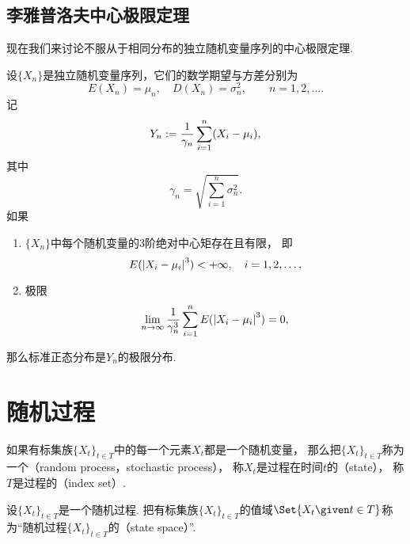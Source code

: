 \subsection{李雅普洛夫中心极限定理}
现在我们来讨论不服从于相同分布的独立随机变量序列的中心极限定理.

\begin{theorem}[李雅普洛夫中心极限定理]
设\(\{X_n\}\)是独立随机变量序列，它们的数学期望与方差分别为\begin{equation*}
	E(X_n) = \mu_n, \quad
	D(X_n) = \sigma_n^2,
	\qquad n=1,2,\dotsc.
\end{equation*}
记\begin{equation*}
	Y_n := \frac{1}{\gamma_n} \sum_{i=1}^n (X_i-\mu_i),
\end{equation*}
其中\begin{equation*}
	\gamma_n = \sqrt{\sum_{i=1}^n \sigma_n^2}.
\end{equation*}
如果\begin{enumerate}
	\item \(\{X_n\}\)中每个随机变量的3阶绝对中心矩存在且有限，
	即\begin{equation*}
		E(\abs{X_i-\mu_i}^3) < +\infty,
		\quad i=1,2,\dotsc,
	\end{equation*}

	\item 极限\begin{equation*}
		\lim_{n\to\infty} \frac{1}{\gamma_n^3}
			\sum_{i=1}^n E(\abs{X_i-\mu_i}^3)
		= 0,
	\end{equation*}
\end{enumerate}
那么标准正态分布是\(Y_n\)的极限分布.
\end{theorem}

\section{随机过程}
\begin{definition}
如果有标集族\(\{X_t\}_{t \in T}\)中的每一个元素\(X_t\)都是一个随机变量，
那么把\(\{X_t\}_{t \in T}\)称为一个（random process，stochastic process），
称\(X_t\)是过程在时间\(t\)的（state），
称\(T\)是过程的（index set）.
\end{definition}

\begin{definition}
设\(\{X_t\}_{t \in T}\)是一个随机过程.
把有标集族\(\{X_t\}_{t \in T}\)的值域\(
	\Set{
		X_t
		\given
		t \in T
	}
\)称为“随机过程\(\{X_t\}_{t \in T}\)的（state space）”.
\end{definition}
